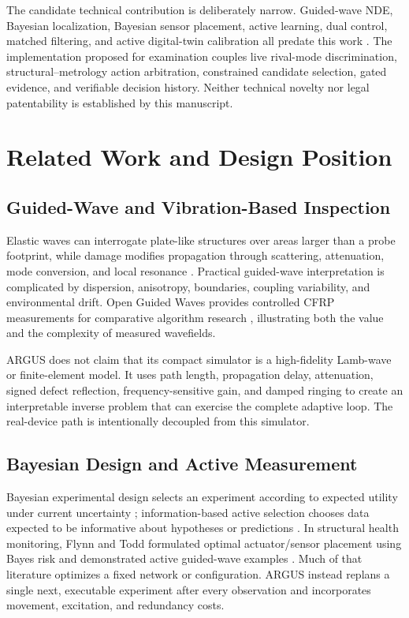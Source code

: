 \documentclass[conference]{IEEEtran}
\begin{document}
The candidate technical contribution is deliberately narrow. Guided-wave NDE, Bayesian localization, Bayesian sensor placement, active learning, dual control, matched filtering, and active digital-twin calibration all predate this work \cite{rose2014,flynn2010,cantero2019,turin1960,fei2025patent}. The implementation proposed for examination couples live rival-mode discrimination, structural--metrology action arbitration, constrained candidate selection, gated evidence, and verifiable decision history. Neither technical novelty nor legal patentability is established by this manuscript.

\section{Related Work and Design Position}
\subsection{Guided-Wave and Vibration-Based Inspection}
Elastic waves can interrogate plate-like structures over areas larger than a probe footprint, while damage modifies propagation through scattering, attenuation, mode conversion, and local resonance \cite{rose2014}. Practical guided-wave interpretation is complicated by dispersion, anisotropy, boundaries, coupling variability, and environmental drift. Open Guided Waves provides controlled CFRP measurements for comparative algorithm research \cite{moll2019}, illustrating both the value and the complexity of measured wavefields.

ARGUS does not claim that its compact simulator is a high-fidelity Lamb-wave or finite-element model. It uses path length, propagation delay, attenuation, signed defect reflection, frequency-sensitive gain, and damped ringing to create an interpretable inverse problem that can exercise the complete adaptive loop. The real-device path is intentionally decoupled from this simulator.

\subsection{Bayesian Design and Active Measurement}
Bayesian experimental design selects an experiment according to expected utility under current uncertainty \cite{chaloner1995}; information-based active selection chooses data expected to be informative about hypotheses or predictions \cite{mackay1992}. In structural health monitoring, Flynn and Todd formulated optimal actuator/sensor placement using Bayes risk and demonstrated active guided-wave examples \cite{flynn2010}. Much of that literature optimizes a fixed network or configuration. ARGUS instead replans a single next, executable experiment after every observation and incorporates movement, excitation, and redundancy costs.
\end{document}
